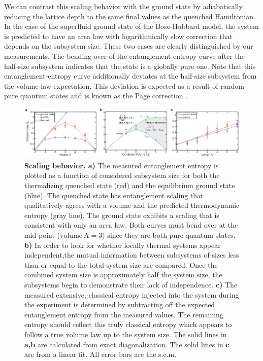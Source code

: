 We can contrast this scaling behavior with the ground state by adiabatically reducing the lattice depth to the same final values as the quenched Hamiltonian. In the case of the superfluid ground state of the Bose-Hubbard model, the system is predicted to have an area law with logarithmically slow correction that depends on the subsystem size\cite{Calabrese2004}. These two cases are clearly distinguished by our measurements. The bending-over of the entanglement-entropy curve after the half-size subsystem indicates that the state is a globally pure one. Note that this entanglement-entropy curve additionally deviates at the half-size subsystem from the volume-law expectation. This deviation is expected as a result of random pure quantum states and is known as the Page correction \cite{Page1993}. 

\begin{figure}[t!]
		\includegraphics[width=\columnwidth]{figures/ch4/fig4_volumeLaw_edit.pdf} 
		\caption{\textbf{Scaling behavior. a)} The measured entanglement entropy is plotted as a function of considered subsystem size for both the thermalizing quenched state (red) and the equilibrium ground state (blue). The quenched state has entanglement scaling that qualitatively agrees with a volume and the predicted thermodynamic entropy (gray line). The ground state exhibits a scaling that is consistent with only an area law. Both curves must bend over at the mid point ($\mathrm{volume~A} = 3$) since they are both pure quantum states. \textbf{b)} In order to look for whether locally thermal systems appear independent,the mutual information between subsystems of sizes less than or equal to the total system size are compared. Once the combined system size is approximately half the system size, the subsystems begin to demonstrate their lack of independence. \textbf{c)} The measured extensive, classical entropy injected into the system during the experiment is determined by subtracting off the expected entanglement entropy from the measured values. The remaining entropy should reflect this truly classical entropy which appears to follow a true volume law up to the system size. The solid lines in \textbf{a,b} are calculated from exact diagonalization. The solid lines in \textbf{c} are from a linear fit. All error bars are the s.e.m.}
		\label{fig:volLaw}	
\end{figure}

